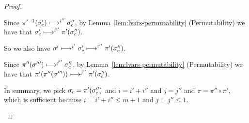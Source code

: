 \begin{proof}
\begin{itemize}
    Since $\pi'^{-1}(\sigma'_c) \longmapsto^{i''} \sigma_c''$, by
    Lemma~\ref{lem:lvars-permutability} (Permutability) we have that
    $\sigma'_c \longmapsto^{i''} \pi'(\sigma_c'')$.

    So we also have $\sigma' \longmapsto^{i'} \sigma_c'
    \longmapsto^{i''} \pi'(\sigma_c'')$.

    Since $\pi''(\sigma''') \longmapsto^{j''} \sigma_c''$, by
    Lemma~\ref{lem:lvars-permutability} (Permutability) we have that
    $\pi'(\pi''(\sigma''')) \longmapsto^{j''} \pi'(\sigma_c'')$.

    In summary, we pick $\sigma_c = \pi'(\sigma_c'')$ and $i = i' + i''$
    and $j = j''$ and $\pi = \pi'' \circ \pi'$, which is sufficient
    because $i = i' + i'' \leq m + 1$ and $j = j'' \leq 1$.
  \end{itemize}

\end{proof}
